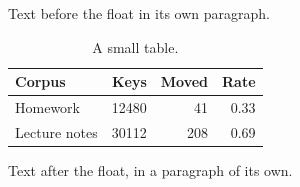 \documentclass[12pt]{article}
\begin{document}
Text before the float in its own paragraph.

\begin{table}[h]
  \small
  \centering
  \caption{A small table.}
  \begin{tabular}{lrrr}
    \toprule
    Corpus & Keys & Moved & Rate \\
    \midrule
    Homework & 12480 & 41 & 0.33 \\
    Lecture notes & 30112 & 208 & 0.69 \\
    \bottomrule
  \end{tabular}
\end{table}

Text after the float, in a paragraph of its own.
\end{document}
